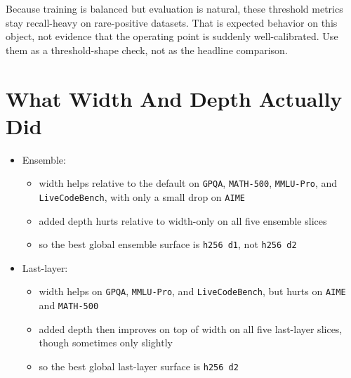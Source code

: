 \documentclass[11pt]{article}
\begin{document}
Because training is balanced but evaluation is natural, these threshold metrics stay recall-heavy on rare-positive datasets. That is expected behavior on this object, not evidence that the operating point is suddenly well-calibrated. Use them as a threshold-shape check, not as the headline comparison.

\section*{What Width And Depth Actually Did}
\begin{itemize}[leftmargin=1.5em]
\item Ensemble:
  \begin{itemize}[leftmargin=1.5em]
  \item width helps relative to the default on \texttt{GPQA}, \texttt{MATH-500}, \texttt{MMLU-Pro}, and \texttt{LiveCodeBench}, with only a small drop on \texttt{AIME}
  \item added depth hurts relative to width-only on all five ensemble slices
  \item so the best global ensemble surface is \texttt{h256 d1}, not \texttt{h256 d2}
  \end{itemize}
\item Last-layer:
  \begin{itemize}[leftmargin=1.5em]
  \item width helps on \texttt{GPQA}, \texttt{MMLU-Pro}, and \texttt{LiveCodeBench}, but hurts on \texttt{AIME} and \texttt{MATH-500}
  \item added depth then improves on top of width on all five last-layer slices, though sometimes only slightly
  \item so the best global last-layer surface is \texttt{h256 d2}
  \end{itemize}
\end{itemize}
\end{document}
